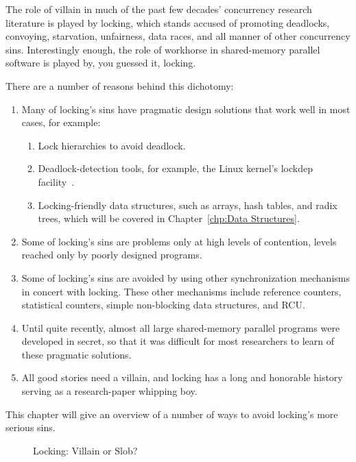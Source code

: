 

The role of villain in much of the past few decades' concurrency research
literature is played by locking,
which stands accused of promoting deadlocks, convoying, starvation,
unfairness, data races, and all manner of other concurrency sins.
Interestingly enough, the role of workhorse in shared-memory parallel
software is played by, you guessed it, locking.

There are a number of reasons behind this dichotomy:

\begin{enumerate}
\item	Many of locking's sins have pragmatic design solutions that
	work well in most cases, for example:
	\begin{enumerate}
	\item	Lock hierarchies to avoid deadlock.
	\item	Deadlock-detection tools, for example, the Linux kernel's
		lockdep facility~\cite{JonathanCorbet2006lockdep}.
	\item	Locking-friendly data structures, such as
		arrays, hash tables, and radix trees, which will
		be covered in Chapter~\ref{chp:Data Structures}.
	\end{enumerate}
\item	Some of locking's sins are problems only at high levels of
	contention, levels reached only by poorly designed programs.
\item	Some of locking's sins are avoided by using other synchronization
	mechanisms in concert with locking.
	These other mechanisms include reference counters,
	statistical counters, simple non-blocking data structures, and RCU.
\item	Until quite recently, almost all large shared-memory parallel
	programs were developed in secret, so that it was difficult for
	most researchers to learn of these pragmatic solutions.
\item	All good stories need a villain, and locking has a long and
	honorable history serving as a research-paper whipping boy.
\end{enumerate}

This chapter will give an overview of a number of ways to avoid locking's
more serious sins.

\begin{figure}[tb]
\begin{center}
\end{center}
\caption{Locking: Villain or Slob?}
\label{fig:locking:Locking: Villain or Slob?}
\end{figure}

